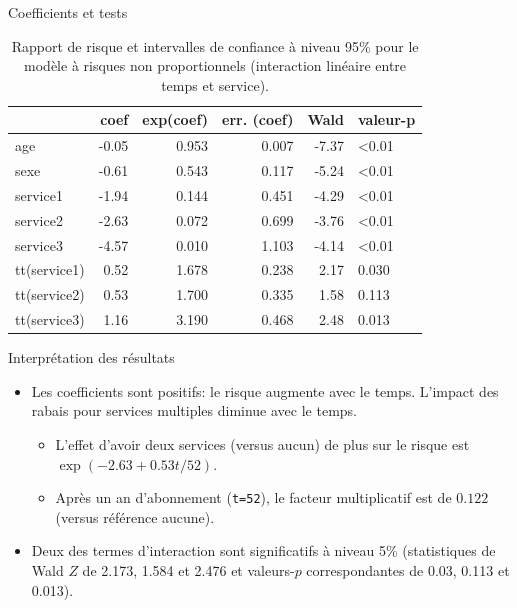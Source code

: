 \documentclass[
  ignorenonframetext,
]{beamer}
\providecommand{\tightlist}{%
  \setlength{\itemsep}{0pt}\setlength{\parskip}{0pt}}
\begin{document}
\begin{frame}{Coefficients et tests}
\protect{}\label{coefficients-et-tests}
\begin{longtable}[t]{lrrrrl}

\caption{\label{tbl-cox-nph}Rapport de risque et intervalles de
confiance à niveau 95\% pour le modèle à risques non proportionnels
(interaction linéaire entre temps et service).}

\tabularnewline

\toprule
 & coef & exp(coef) & err. (coef) & Wald & valeur-p\\
\midrule
age & -0.05 & 0.953 & 0.007 & -7.37 & <0.01\\
sexe & -0.61 & 0.543 & 0.117 & -5.24 & <0.01\\
service1 & -1.94 & 0.144 & 0.451 & -4.29 & <0.01\\
service2 & -2.63 & 0.072 & 0.699 & -3.76 & <0.01\\
service3 & -4.57 & 0.010 & 1.103 & -4.14 & <0.01\\
\addlinespace
tt(service1) & 0.52 & 1.678 & 0.238 & 2.17 & 0.030\\
tt(service2) & 0.53 & 1.700 & 0.335 & 1.58 & 0.113\\
tt(service3) & 1.16 & 3.190 & 0.468 & 2.48 & 0.013\\
\bottomrule

\end{longtable}
\end{frame}

\begin{frame}[fragile]{Interprétation des résultats}
\protect{}\label{interpruxe9tation-des-ruxe9sultats}
\begin{itemize}
\tightlist
\item
  Les coefficients sont positifs: le risque augmente avec le temps.
  L'impact des rabais pour services multiples diminue avec le temps.

  \begin{itemize}
  \tightlist
  \item
    L'effet d'avoir deux services (versus aucun) de plus sur le risque
    est \(\exp(-2.63 + 0.53 t / 52)\).
  \item
    Après un an d'abonnement (\texttt{t=52}), le facteur multiplicatif
    est de \(0.122\) (versus référence aucune).
  \end{itemize}
\item
  Deux des termes d'interaction sont significatifs à niveau 5\%
  (statistiques de Wald \(Z\) de 2.173, 1.584 et 2.476 et valeurs-\(p\)
  correspondantes de 0.03, 0.113 et 0.013).
\end{itemize}
\end{frame}
\end{document}
